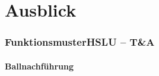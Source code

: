 \section{Ausblick}

\begin{frame}
	\frametitle{Funktionsmuster\hfill{}\footnotesize HSLU -- T\&A}
	\framesubtitle{Ballnachführung}
\end{frame}
